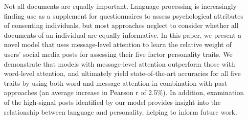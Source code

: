 Not all documents are equally important. Language processing is increasingly finding use as a supplement for questionnaires to assess psychological attributes of consenting individuals, but most approaches neglect to consider whether all documents of an individual are equally informative. In this paper, we present a novel model that uses message-level attention to learn the relative weight of users' social media posts for assessing their five factor personality traits. We demonstrate that models with message-level attention outperform those with word-level attention, and ultimately yield state-of-the-art accuracies for all five traits by using both word and message attention in combination with past approaches (an average increase in Pearson r of 2.5\%). In addition, examination of the high-signal posts identified by our model provides insight into the relationship between language and personality, helping to inform future work.
